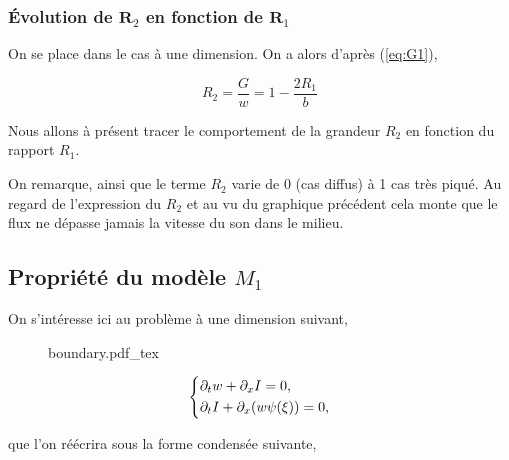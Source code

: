 \subsubsection{Évolution de $\mathbf{R}_2$ en fonction de $\mathbf{R}_1$}

On se place dans le cas à une dimension. On a alors d'après (\ref{eq:G1}),

\begin{equation}
 R_2 = \frac{G}{w} = 1 - \frac{2R_1}{b}
 \end{equation}

Nous allons à présent tracer le comportement de la grandeur $R_2$ en fonction du rapport $R_1$.
 
\begin{center}
\hspace{4cm}
\end{center}

On remarque, ainsi que le terme $R_2$ varie de 0 (cas diffus) à 1 cas très piqué. Au regard de l'expression du $R_2$ et au vu du graphique précédent cela monte que le flux ne dépasse jamais la vitesse du son dans le milieu. 









\subsection{Propriété du modèle $M_1$}
On s'intéresse ici au problème à une dimension suivant, 


\begin{figure}
\def\svgwidth{\linewidth}
{boundary.pdf_tex}
% 
\caption{}
\end{figure}






\begin{equation}
\label{eq:sysh1D}
\left\{
\begin{aligned}
&\partial_t w + \partial_x I = 0,\\
&\partial_t I + \partial_x ( w\psi(\xi)) = 0,
\end{aligned}
\right.
\end{equation}

que l'on réécrira sous la forme condensée suivante,

